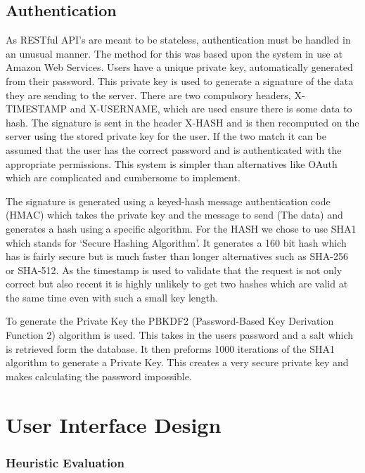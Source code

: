 \documentclass[11pt,a4paper]{article}
\begin{document}
\subsection{Authentication}

As RESTful API's are meant to be stateless, authentication must be handled in an unusual manner. The method for this was based upon the system in use at Amazon Web Services\cite{auth}. Users have a unique private key, automatically generated from their password. This private key is used to generate a signature of the data they are sending to the server. There are two compulsory headers, X-TIMESTAMP and X-USERNAME, which are used ensure there is some data to hash. The signature is sent in the header X-HASH and is then recomputed on the server using the stored private key for the user. If the two match it can be assumed that the user has the correct password and is authenticated with the appropriate permissions. This system is simpler than alternatives like OAuth which are complicated and cumbersome to implement.

The signature is generated using a keyed-hash message authentication code (HMAC) which takes the private key and the message to send (The data) and generates a hash using a specific algorithm. For the HASH we chose to use SHA1 which stands for `Secure Hashing Algorithm'. It generates a 160 bit hash which has is fairly secure but is much faster than longer alternatives such as SHA-256 or SHA-512. As the timestamp is used to validate that the request is not only correct but also recent it is highly unlikely to get two hashes which are valid at the same time even with such a small key length.

To generate the Private Key the PBKDF2 (Password-Based Key Derivation Function 2) algorithm is used. This takes in the users password and a salt which is retrieved form the database. It then preforms 1000 iterations of the SHA1 algorithm to generate a Private Key. This creates a very secure private key and makes calculating the password impossible.




\section{User Interface Design}


\subsubsection{Heuristic Evaluation}
\end{document}
